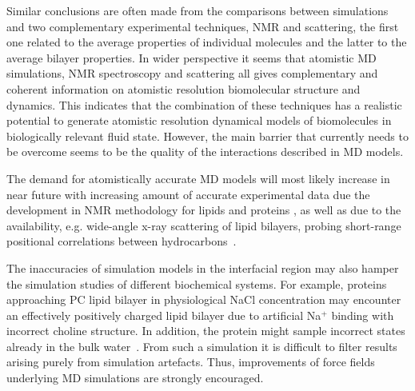 \documentclass[aps,prl,superscriptaddress,twocolumn]{revtex4}
\begin{document}
Similar conclusions are often made from the comparisons between simulations and two complementary 
experimental techniques, NMR and scattering, the first one related to the average properties
of individual molecules and the latter to the average bilayer properties. 
In wider perspective it seems that atomistic MD simulations, NMR spectroscopy and scattering all gives
complementary and coherent information on atomistic resolution biomolecular structure and dynamics. 
This indicates that the combination of these techniques has a realistic potential to generate atomistic 
resolution dynamical models of biomolecules in biologically relevant fluid state. However, the
main barrier that currently needs to be overcome seems to be the quality of the interactions described in MD models.

The demand for atomistically accurate MD models will most likely increase in near future with increasing
amount of accurate experimental data due the development in NMR methodology  
for lipids \cite{ferreira13,leftin13,leftin14,ferreira15,pham15} and proteins \cite{hansen15}, 
as well as due to the availability, e.g. wide-angle x-ray scattering of lipid bilayers, probing short-range positional 
correlations between hydrocarbons~\cite{spaar.2003}. 

The inaccuracies of simulation models in the interfacial region may also hamper the simulation 
studies of different biochemical systems. For example, proteins approaching
PC lipid bilayer in physiological NaCl concentration may encounter an effectively positively charged 
lipid bilayer due to artificial Na$^+$ binding with incorrect choline structure. In addition,
the protein might sample incorrect states already in the bulk water~\cite{best11,beauchamp12,rauscher15}.
From such a simulation it is difficult to filter results arising purely from simulation artefacts.
Thus, improvements of force fields underlying MD simulations are strongly encouraged.




%

\begin{acknowledgments}
\end{acknowledgments}



\end{document}
